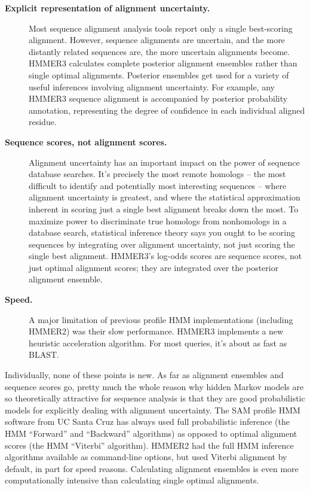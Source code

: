 \begin{description}
\item[\textbf{Explicit representation of alignment uncertainty.}]
  Most sequence alignment analysis tools report only a single
  best-scoring alignment. However, sequence alignments are uncertain,
  and the more distantly related sequences are, the more uncertain
  alignments become. HMMER3 calculates complete posterior alignment
  ensembles rather than single optimal alignments. Posterior ensembles
  get used for a variety of useful inferences involving alignment
  uncertainty. For example, any HMMER3 sequence alignment is
  accompanied by posterior probability annotation, representing the
  degree of confidence in each individual aligned residue.

\item[\textbf{Sequence scores, not alignment scores.}]  Alignment
  uncertainty has an important impact on the power of sequence
  database searches.  It's precisely the most remote homologs -- the
  most difficult to identify and potentially most interesting
  sequences -- where alignment uncertainty is greatest, and where the
  statistical approximation inherent in scoring just a single best
  alignment breaks down the most. To maximize power to discriminate
  true homologs from nonhomologs in a database search, statistical
  inference theory says you ought to be scoring sequences by
  integrating over alignment uncertainty, not just scoring the single
  best alignment. HMMER3's log-odds scores are sequence scores, not
  just optimal alignment scores; they are integrated over the
  posterior alignment ensemble.
  
\item[\textbf{Speed.}] A major limitation of previous profile HMM
  implementations (including HMMER2) was their slow
  performance. HMMER3 implements a new heuristic acceleration
  algorithm. For most queries, it's about as fast as BLAST.
\end{description}

Individually, none of these points is new. As far as alignment
ensembles and sequence scores go, pretty much the whole reason why
hidden Markov models are so theoretically attractive for sequence
analysis is that they are good probabilistic models for explicitly
dealing with alignment uncertainty. The SAM profile HMM software from
UC Santa Cruz has always used full probabilistic inference (the HMM
``Forward'' and ``Backward'' algorithms) as opposed to optimal
alignment scores (the HMM ``Viterbi'' algorithm). HMMER2 had the full
HMM inference algorithms available as command-line options, but used
Viterbi alignment by default, in part for speed reasons. Calculating
alignment ensembles is even more computationally intensive than
calculating single optimal alignments.

